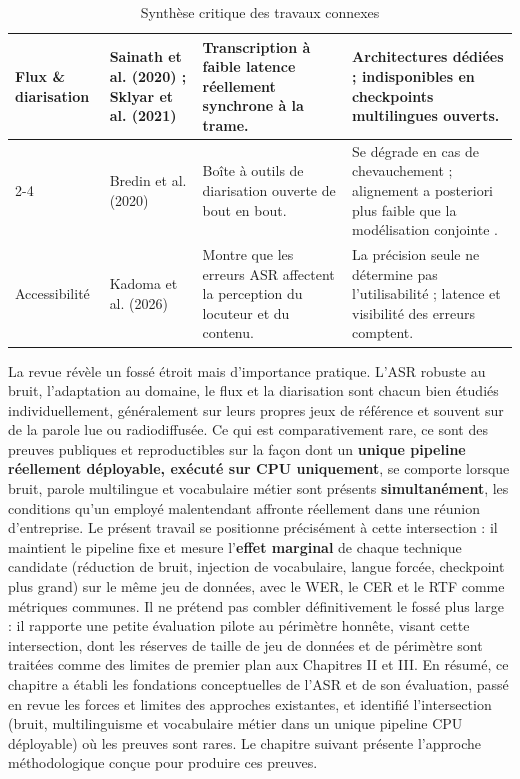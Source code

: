 \documentclass[12pt]{report}
\begin{document}
\begin{table}[htbp]
\begin{tabular}{|p{2.2cm}|p{2.8cm}|p{4.4cm}|p{4.6cm}|}
\multirow{2}{2.2cm}{Flux \& diarisation}
& Sainath et al. (2020) \cite{sainath2020streaming} ; Sklyar et al. (2021) \cite{sklyar2021streaming}
& Transcription à faible latence réellement synchrone à la trame.
& Architectures dédiées ; indisponibles en checkpoints multilingues ouverts. \\ \cline{2-4}
& Bredin et al. (2020) \cite{bredin2020pyannote}
& Boîte à outils de diarisation ouverte de bout en bout.
& Se dégrade en cas de chevauchement ; alignement a posteriori plus faible que la modélisation conjointe \cite{raj2021integration}. \\ \hline
\multirow{1}{2.2cm}{Accessibilité}
& Kadoma et al. (2026) \cite{kadoma2026lost}
& Montre que les erreurs ASR affectent la perception du locuteur et du contenu.
& La précision seule ne détermine pas l'utilisabilité ; latence et visibilité des erreurs comptent. \\ \hline
\end{tabular}
\caption{Synthèse critique des travaux connexes}
\label{tab:sota_synthesis}
\end{table}
La revue révèle un fossé étroit mais d'importance pratique. L'ASR robuste au bruit, l'adaptation au domaine, le flux et la diarisation sont chacun bien étudiés individuellement, généralement sur leurs propres jeux de référence et souvent sur de la parole lue ou radiodiffusée. Ce qui est comparativement rare, ce sont des preuves publiques et reproductibles sur la façon dont un \textbf{unique pipeline réellement déployable, exécuté sur CPU uniquement}, se comporte lorsque bruit, parole multilingue et vocabulaire métier sont présents \textbf{simultanément}, les conditions qu'un employé malentendant affronte réellement dans une réunion d'entreprise. Le présent travail se positionne précisément à cette intersection : il maintient le pipeline fixe et mesure l'\textbf{effet marginal} de chaque technique candidate (réduction de bruit, injection de vocabulaire, langue forcée, checkpoint plus grand) sur le même jeu de données, avec le WER, le CER et le RTF comme métriques communes. Il ne prétend pas combler définitivement le fossé plus large : il rapporte une petite évaluation pilote au périmètre honnête, visant cette intersection, dont les réserves de taille de jeu de données et de périmètre sont traitées comme des limites de premier plan aux Chapitres II et III.
\vspace{0.5em}
En résumé, ce chapitre a établi les fondations conceptuelles de l'ASR et de son évaluation, passé en revue les forces et limites des approches existantes, et identifié l'intersection (bruit, multilinguisme et vocabulaire métier dans un unique pipeline CPU déployable) où les preuves sont rares. Le chapitre suivant présente l'approche méthodologique conçue pour produire ces preuves.
\end{document}

